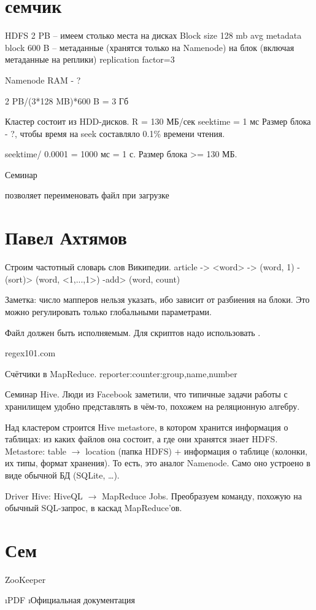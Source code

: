 \section{семчик}
HDFS 2 PB -- имеем столько места на дисках
Block size 128 mb
avg metadata block 600 B -- метаданные (хранятся только на Namenode) на блок (включая метаданные на реплики)
replication factor=3

Namenode RAM - ?

2 PB/(3*128 MB)*600 B = 3 Гб



Кластер состоит из HDD-дисков. 
R = 130 МБ/сек
seektime = 1 мс
Размер блока - ?, чтобы время на seek составляло 0.1\% времени чтения.

seektime/ 0.0001 = 1000 мс = 1 с.
Размер блока >= 130 МБ.
 


Семинар

 позволяет переименовать файл при загрузке

\section{Павел Ахтямов}
Строим частотный словарь слов Википедии. article -> <word> -> (word, 1) -(sort)> (word, <1,...,1>) -add> (word, count) 

Заметка: число мапперов нельзя указать, ибо зависит от разбиения на блоки. Это можно регулировать только глобальными параметрами.

Файл должен быть исполняемым. Для скриптов надо использовать .

regex101.com

Счётчики в MapReduce. reporter:counter:group,name,number


Семинар
Hive. Люди из Facebook заметили, что типичные задачи работы с хранилищем удобно представлять в чём-то, похожем на реляционную алгебру.

Над кластером строится Hive metastore, в котором хранится информация о таблицах: из каких файлов она состоит, а где они хранятся знает HDFS.
Metastore: table $\rightarrow$ location (папка HDFS) + информация о таблице (колонки, их типы, формат хранения).
То есть, это аналог Namenode. Само оно устроено в виде обычной БД (SQLite, \dots).

Driver Hive: HiveQL $\rightarrow$ MapReduce Jobs.
Преобразуем команду, похожую на обычный SQL-запрос, в каскад MapReduce'ов.


\section{Сем}
ZooKeeper
\begin{enumerate}
	\i PDF
	\i Официальная документация
\end{enumerate}

